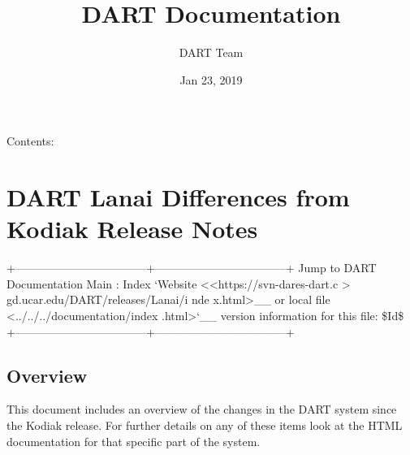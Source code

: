 \documentclass[letterpaper,10pt,english]{sphinxmanual}
\title{DART Documentation}
\date{Jan 23, 2019}
\author{DART Team}
\begin{document}
\maketitle
\tableofcontents
{}\label{index::doc}


Contents:


\chapter{DART Lanai Differences from Kodiak Release Notes}
\label{docs/Lanai_diffs_from_Kodiak::doc}\label{docs/Lanai_diffs_from_Kodiak:dart-lanai-differences-from-kodiak-release-notes}\label{docs/Lanai_diffs_from_Kodiak:welcome-to-dart-s-documentation}
+-----------------------------------+-----------------------------------+
\textbar{}                                   \textbar{} \textbar{} Jump to DART Documentation Main \textbar{}
\textbar{}                                   \textbar{}                                   \textbar{}
\textbar{}                                   \textbar{} :   Index {}`Website               \textbar{}
\textbar{}                                   \textbar{}     \textless{}\textless{}https://svn-dares-dart.c \textbar{}
\textbar{}                                   \textbar{} \textgreater{}                                 \textbar{}
\textbar{}                                   \textbar{}                                   \textbar{}
\textbar{}                                   \textbar{} gd.ucar.edu/DART/releases/Lanai/i \textbar{}
\textbar{}                                   \textbar{} nde                               \textbar{}
\textbar{}                                   \textbar{} x.html\textgreater{}\_\_                    \textbar{}
\textbar{}                                   \textbar{}   or local file                   \textbar{}
\textbar{}                                   \textbar{} \textless{}../../../documentation/index  \textbar{}
\textbar{}                                   \textbar{} .html\textgreater{}{}`\_\_ \textbar{} version         \textbar{}
\textbar{}                                   \textbar{} information for this file: \textbar{}      \textbar{}
\textbar{}                                   \textbar{} \$Id\$                            \textbar{}
+-----------------------------------+-----------------------------------+


\section{Overview}
\label{docs/Lanai_diffs_from_Kodiak:overview}
This document includes an overview of the changes in the DART system
since the Kodiak release. For further details on any of these items look
at the HTML documentation for that specific part of the system.
\end{document}
